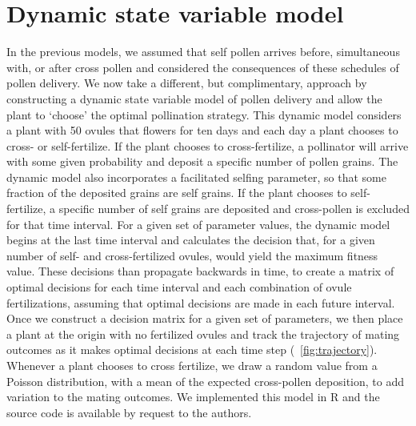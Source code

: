 \documentclass[letterpaper,titlepage]{scrartcl}
\begin{document}
\section{Dynamic state variable model}
In the previous models, we assumed that self pollen arrives before,
simultaneous with, or after cross pollen and considered the
consequences of these schedules of pollen delivery. We now take a
different, but complimentary, approach by constructing a dynamic state
variable model \citep{Clark00} of pollen delivery and allow the plant
to `choose' the optimal pollination strategy. This dynamic model
considers a plant with 50 ovules that flowers for ten days and each
day a plant chooses to cross- or self-fertilize. If the plant chooses
to cross-fertilize, a pollinator will arrive with some given
probability and deposit a specific number of pollen grains. The
dynamic model also incorporates a facilitated selfing parameter, so
that some fraction of the deposited grains are self grains. If the
plant chooses to self-fertilize, a specific number of self grains are
deposited and cross-pollen is excluded for that time interval. For a
given set of parameter values, the dynamic model begins at the last
time interval and calculates the decision that, for a given number of
self- and cross-fertilized ovules, would yield the maximum fitness
value. These decisions than propagate backwards in time, to create a
matrix of optimal decisions for each time interval and each
combination of ovule fertilizations, assuming that optimal decisions
are made in each future interval. Once we construct a decision matrix
for a given set of parameters, we then place a plant at the origin
with no fertilized ovules and track the trajectory of mating outcomes
as it makes optimal decisions at each time step
({\fref}~\ref{fig:trajectory}). Whenever a plant chooses to cross
fertilize, we draw a random value from a Poisson distribution, with a
mean of the expected cross-pollen deposition, to add variation to the
mating outcomes. We implemented this model in R \citep{R} and the
source code is available by request to the authors.
\end{document}
